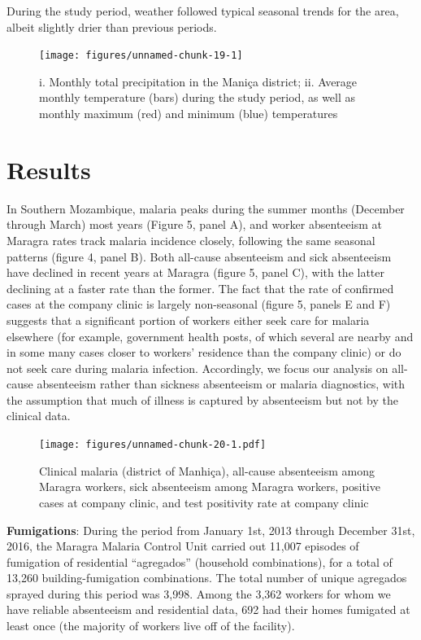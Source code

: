 \documentclass[]{article}
\begin{document}
During the study period, weather followed typical seasonal trends for
the area, albeit slightly drier than previous periods.

\begin{figure}[h]

{\centering \texttt{[image: figures/unnamed-chunk-19-1]} 

}

\caption{i. Monthly total precipitation in the Maniça district; ii. Average monthly temperature (bars) during the study period, as well as monthly maximum (red) and minimum (blue) temperatures}\label{fig:unnamed-chunk-19}
\end{figure}

\section{Results}\label{results}

In Southern Mozambique, malaria peaks during the summer months (December
through March) most years (Figure 5, panel A), and worker absenteeism at
Maragra rates track malaria incidence closely, following the same
seasonal patterns (figure 4, panel B). Both all-cause absenteeism and
sick absenteeism have declined in recent years at Maragra (figure 5,
panel C), with the latter declining at a faster rate than the former.
The fact that the rate of confirmed cases at the company clinic is
largely non-seasonal (figure 5, panels E and F) suggests that a
significant portion of workers either seek care for malaria elsewhere
(for example, government health posts, of which several are nearby and
in some many cases closer to workers' residence than the company clinic)
or do not seek care during malaria infection. Accordingly, we focus our
analysis on all-cause absenteeism rather than sickness absenteeism or
malaria diagnostics, with the assumption that much of illness is
captured by absenteeism but not by the clinical data.

\begin{figure}
\centering
\texttt{[image: figures/unnamed-chunk-20-1.pdf]}
\caption{Clinical malaria (district of Manhiça), all-cause absenteeism
among Maragra workers, sick absenteeism among Maragra workers, positive
cases at company clinic, and test positivity rate at company clinic}
\end{figure}

\textbf{Fumigations}: During the period from January 1st, 2013 through
December 31st, 2016, the Maragra Malaria Control Unit carried out 11,007
episodes of fumigation of residential ``agregados'' (household
combinations), for a total of 13,260 building-fumigation combinations.
The total number of unique agregados sprayed during this period was
3,998. Among the 3,362 workers for whom we have reliable absenteeism and
residential data, 692 had their homes fumigated at least once (the
majority of workers live off of the facility).
\end{document}

